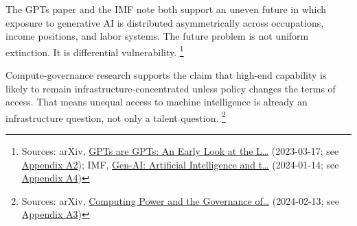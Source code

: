 \documentclass[
  american,
  11pt,
  letterpaper,
]{article}
\begin{document}
The GPTs paper and the IMF note both support an uneven future in which
exposure to generative AI is distributed asymmetrically across
occupations, income positions, and labor systems. The future problem is
not uniform extinction. It is differential vulnerability. \footnote{Sources:
  arXiv, \href{https://arxiv.org/abs/2303.10130}{GPTs are GPTs: An Early
  Look at the L\ldots{}} (2023-03-17; see
  \hyperref[ch-09-appendix-a2-gpts-are-gpts-an-early-look-at-the-labor-market-impact-potential-of-large-language-models]{Appendix
  A2}); IMF,
  \href{https://www.imf.org/en/publications/staff-discussion-notes/issues/2024/01/14/gen-ai-artificial-intelligence-and-the-future-of-work-542379}{Gen-AI:
  Artificial Intelligence and t\ldots{}} (2024-01-14; see
  \hyperref[ch-09-appendix-a4-gen-ai-artificial-intelligence-and-the-future-of-work]{Appendix
  A4})}

Compute-governance research supports the claim that high-end capability
is likely to remain infrastructure-concentrated unless policy changes
the terms of access. That means unequal access to machine intelligence
is already an infrastructure question, not only a talent question.
\footnote{Sources: arXiv,
  \href{https://arxiv.org/abs/2402.08797}{Computing Power and the
  Governance of\ldots{}} (2024-02-13; see
  \hyperref[ch-09-appendix-a3-computing-power-and-the-governance-of-artificial-intelligence]{Appendix
  A3})}
\end{document}
